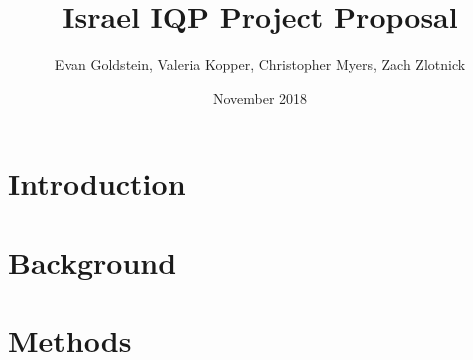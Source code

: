 \documentclass{article}
\title{Israel IQP Project Proposal}
\author{Evan Goldstein, Valeria Kopper, Christopher Myers, Zach Zlotnick}
\date{November 2018}
\begin{document}
\maketitle
\tableofcontents
\newpage
{}

\section{Introduction}

\section{Background}

\section{Methods}
\end{document}
